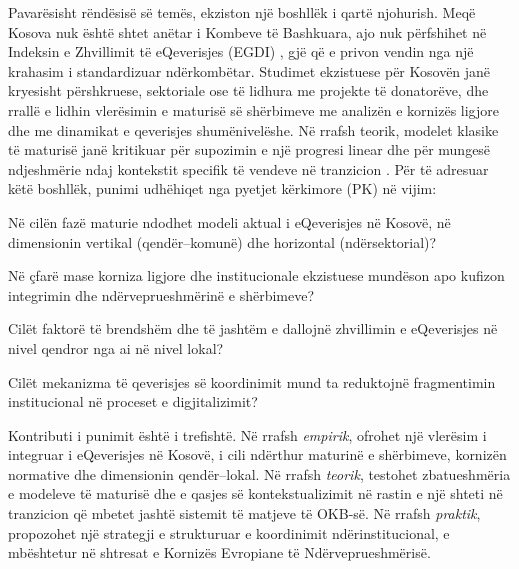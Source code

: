 \documentclass[conference]{IEEEtran}
\begin{document}
Pavarësisht rëndësisë së temës, ekziston një boshllëk i qartë njohurish.
Meqë Kosova nuk është shtet anëtar i Kombeve të Bashkuara, ajo nuk
përfshihet në Indeksin e Zhvillimit të eQeverisjes (EGDI)
\cite{undesa2024}, gjë që e privon vendin nga një krahasim i standardizuar
ndërkombëtar. Studimet ekzistuese për Kosovën janë kryesisht përshkruese,
sektoriale ose të lidhura me projekte të donatorëve, dhe rrallë e lidhin
vlerësimin e maturisë së shërbimeve me analizën e kornizës ligjore dhe me
dinamikat e qeverisjes shumënivelëshe. Në rrafsh teorik, modelet klasike të
maturisë janë kritikuar për supozimin e një progresi linear
\cite{coursey2008} dhe për mungesë ndjeshmërie ndaj kontekstit specifik të
vendeve në tranzicion \cite{janowski2015}. Për të adresuar këtë boshllëk,
punimi udhëhiqet nga pyetjet kërkimore (PK) në vijim:

\begin{IEEEdescription}[\IEEEsetlabelwidth{PK4:}]
  \item[PK1:] Në cilën fazë maturie ndodhet modeli aktual i eQeverisjes në
        Kosovë, në dimensionin vertikal (qendër--komunë) dhe horizontal
        (ndërsektorial)?
  \item[PK2:] Në çfarë mase korniza ligjore dhe institucionale ekzistuese
        mundëson apo kufizon integrimin dhe ndërveprueshmërinë e
        shërbimeve?
  \item[PK3:] Cilët faktorë të brendshëm dhe të jashtëm e dallojnë
        zhvillimin e eQeverisjes në nivel qendror nga ai në nivel lokal?
  \item[PK4:] Cilët mekanizma të qeverisjes së koordinimit mund ta
        reduktojnë fragmentimin institucional në proceset e digjitalizimit?
\end{IEEEdescription}

Kontributi i punimit është i trefishtë. Në rrafsh \textit{empirik}, ofrohet
një vlerësim i integruar i eQeverisjes në Kosovë, i cili ndërthur maturinë
e shërbimeve, kornizën normative dhe dimensionin qendër--lokal. Në rrafsh
\textit{teorik}, testohet zbatueshmëria e modeleve të maturisë dhe e qasjes
së kontekstualizimit në rastin e një shteti në tranzicion që mbetet jashtë
sistemit të matjeve të OKB-së. Në rrafsh \textit{praktik}, propozohet një
strategji e strukturuar e koordinimit ndërinstitucional, e mbështetur në
shtresat e Kornizës Evropiane të Ndërveprueshmërisë.

\end{document}
